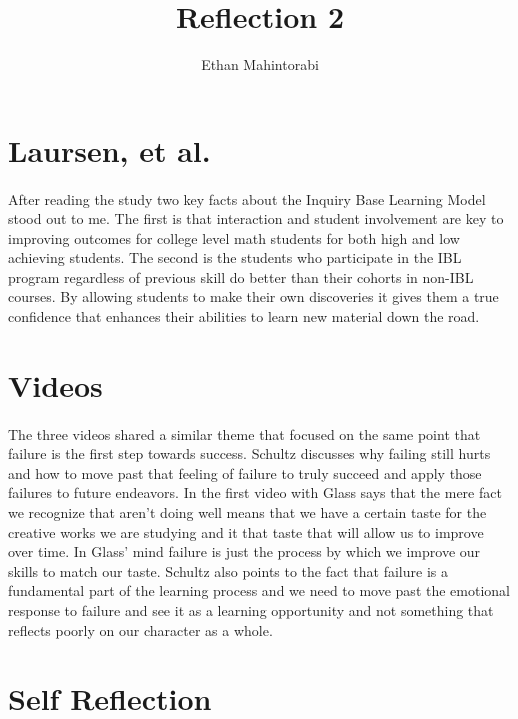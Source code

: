 \documentclass{article}
\begin{document}
  
  \title{Reflection 2}
  \author{Ethan Mahintorabi}
  
  \maketitle

  
  \section*{Laursen, et al.}
    \paragraph{}
         After reading the study two key facts about the Inquiry Base Learning Model stood out to me. The first is that interaction and student involvement are key to improving outcomes for college level math students for both high and low achieving students. The second is the students who participate in the IBL program regardless of previous skill do better than their cohorts in non-IBL courses. By allowing students to make their own discoveries it gives them a true confidence that enhances their abilities to learn new material down the road.

  \section*{Videos}
    \paragraph{}
        The three videos shared a similar theme that focused on the same point that failure is the first step towards success. Schultz discusses why failing still hurts and how to move past that feeling of failure to truly succeed and apply those failures to future endeavors. In the first video with Glass says that the mere fact we recognize  that aren't doing well means that we have a certain taste for the creative works we are studying and it that taste that will allow us to improve over time. In Glass' mind failure is just the process by which we improve our skills to match our taste. Schultz also points to the fact that failure is a fundamental part of the learning process and we need to move past the emotional response to failure and see it as a learning opportunity and not something that reflects poorly on our character as a whole.

  \section*{Self Reflection}
\end{document}

